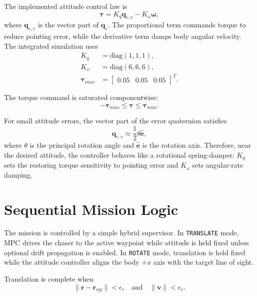 \documentclass[11pt]{article}
\begin{document}
The implemented attitude control law is
\begin{equation}
    \bm{\tau}
    =
    K_q\bm{q}_{e,v}
    -
    K_{\omega}\bm{\omega},
\end{equation}
where \(\bm{q}_{e,v}\) is the vector part of \(\bm{q}_e\). The proportional term commands torque to reduce pointing error, while the derivative term damps body angular velocity. The integrated simulation uses
\begin{align}
K_q &= \mathrm{diag}(1,1,1),\\
K_{\omega} &= \mathrm{diag}(6,6,6),\\
\bm{\tau}_{max} &= \begin{bmatrix}0.05 & 0.05 & 0.05\end{bmatrix}^{T}.
\end{align}

The torque command is saturated componentwise:
\begin{equation}
    -\bm{\tau}_{max}
    \leq
    \bm{\tau}
    \leq
    \bm{\tau}_{max}.
\end{equation}

For small attitude errors, the vector part of the error quaternion satisfies
\begin{equation}
    \bm{q}_{e,v}
    \approx
    \frac{1}{2}\theta\hat{\bm{e}},
\end{equation}
where \(\theta\) is the principal rotation angle and \(\hat{\bm{e}}\) is the rotation axis. Therefore, near the desired attitude, the controller behaves like a rotational spring-damper: \(K_q\) sets the restoring torque sensitivity to pointing error and \(K_{\omega}\) sets angular-rate damping.

\section{Sequential Mission Logic}

The mission is controlled by a simple hybrid supervisor. In \texttt{TRANSLATE} mode, MPC drives the chaser to the active waypoint while attitude is held fixed unless optional drift propagation is enabled. In \texttt{ROTATE} mode, translation is held fixed while the attitude controller aligns the body \(+x\) axis with the target line of sight.

Translation is complete when
\begin{equation}
    \|\bm{r}-\bm{r}_{wp}\| < \epsilon_r
    \quad\text{and}\quad
    \|\bm{v}\| < \epsilon_v.
\end{equation}
\end{document}
